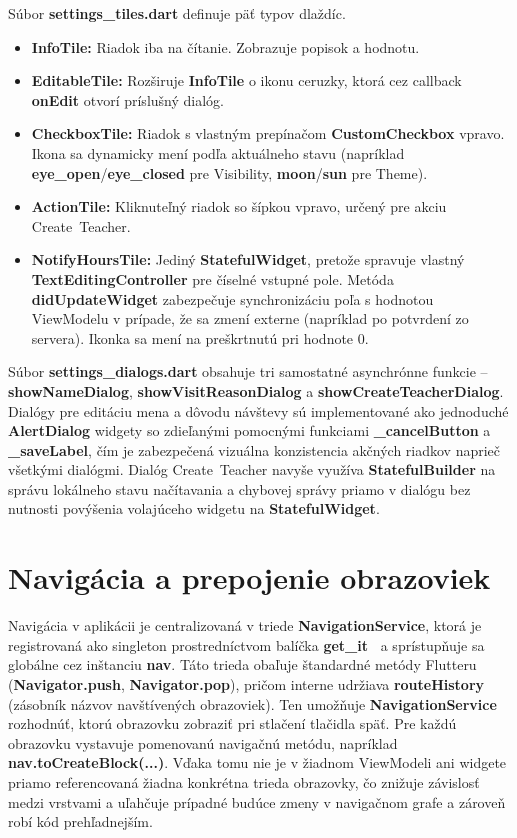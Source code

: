 Súbor \textbf{settings\_tiles.dart} definuje päť typov dlaždíc.
\begin{itemize}
    \item \textbf{InfoTile:} Riadok iba na čítanie. Zobrazuje popisok a hodnotu.
    \item \textbf{EditableTile:} Rozširuje \textbf{InfoTile} o ikonu ceruzky, ktorá cez callback \textbf{onEdit} otvorí príslušný dialóg.
    \item \textbf{CheckboxTile:} Riadok s vlastným prepínačom \textbf{CustomCheckbox} 
          vpravo. Ikona sa dynamicky mení podľa aktuálneho stavu 
          (napríklad \textbf{eye\_open}/\textbf{eye\_closed} pre Visibility, 
          \textbf{moon}/\textbf{sun} pre Theme).
          \item \textbf{ActionTile:} Kliknuteľný riadok so šípkou vpravo, 
          určený pre akciu Create~Teacher.
          \item \textbf{NotifyHoursTile:} Jediný \textbf{StatefulWidget}, pretože spravuje vlastný 
          \textbf{TextEditingController} pre číselné vstupné pole. 
          Metóda \textbf{didUpdateWidget} zabezpečuje synchronizáciu 
          poľa s hodnotou ViewModelu v prípade, že sa zmení externe 
          (napríklad po potvrdení zo servera). Ikonka sa mení na preškrtnutú pri hodnote 0.
\end{itemize}

Súbor \textbf{settings\_dialogs.dart} obsahuje tri samostatné 
asynchrónne funkcie – \textbf{showNameDialog}, 
\textbf{showVisitReasonDialog} a \textbf{showCreateTeacherDialog}. 
Dialógy pre editáciu mena a dôvodu návštevy sú implementované 
ako jednoduché \textbf{AlertDialog} widgety so zdieľanými pomocnými 
funkciami \textbf{\_cancelButton} a \textbf{\_saveLabel}, 
čím je zabezpečená vizuálna konzistencia akčných riadkov naprieč 
všetkými dialógmi. Dialóg Create~Teacher navyše využíva 
\textbf{StatefulBuilder} na správu lokálneho stavu načítavania 
a chybovej správy priamo v dialógu bez nutnosti 
povýšenia volajúceho widgetu na \textbf{StatefulWidget}.

\section{Navigácia a prepojenie obrazoviek}
\label{sec:impl-navigacia}
Navigácia v aplikácii je centralizovaná v triede \textbf{NavigationService}, 
ktorá je registrovaná ako singleton prostredníctvom balíčka \textbf{get\_it~\cite{getit}} a sprístupňuje sa globálne cez inštanciu \textbf{nav}. 
Táto trieda obaľuje štandardné metódy Flutteru 
(\textbf{Navigator.push}, \textbf{Navigator.pop}), pričom interne
udržiava \textbf{routeHistory} (zásobník názvov navštívených obrazoviek).
Ten umožňuje \textbf{NavigationService} rozhodnúť, ktorú obrazovku
zobraziť pri stlačení tlačidla späť. Pre každú obrazovku vystavuje pomenovanú navigačnú metódu, 
napríklad \textbf{nav.toCreateBlock(...)}. 
Vďaka tomu nie je v žiadnom ViewModeli ani widgete 
priamo referencovaná žiadna konkrétna trieda obrazovky, 
čo znižuje závislosť medzi vrstvami a uľahčuje prípadné budúce 
zmeny v navigačnom grafe a zároveň robí kód prehľadnejším.

